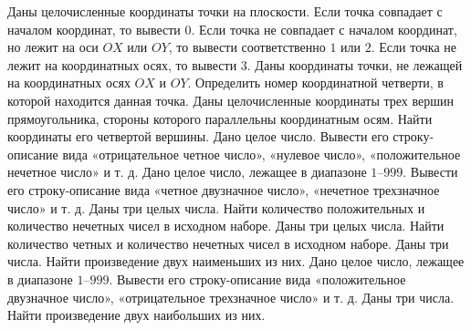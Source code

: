 Даны целочисленные координаты точки на плоскости. Если точка совпадает с началом координат, то вывести $0$. Если точка не совпадает с началом координат, но лежит на оси $OX$ или $OY$, то вывести соответственно $1$ или $2$. Если точка не лежит на координатных осях, то вывести $3$.
Даны координаты точки, не лежащей на координатных осях $OX$ и $OY$. Определить номер координатной четверти, в которой находится данная точка.
Даны целочисленные координаты трех вершин прямоугольника, стороны которого параллельны координатным осям. Найти координаты его четвертой вершины.
Дано целое число. Вывести его строку-описание вида «отрицательное четное число», «нулевое число», «положительное нечетное число» и т. д.
Дано целое число, лежащее в диапазоне $1$--$999$. Вывести его строку-описание вида «четное двузначное число», «нечетное трехзначное число» и т. д.
Даны три целых числа. Найти количество положительных и количество нечетных чисел в исходном наборе.
Даны три целых числа. Найти количество четных и количество нечетных чисел в исходном наборе.
Даны три числа. Найти произведение двух наименьших из них.
Дано целое число, лежащее в диапазоне $1$--$999$. Вывести его строку-описание вида «положительное двузначное число», «отрицательное трехзначное число» и т. д.
Даны три числа. Найти произведение двух наибольших из них.
